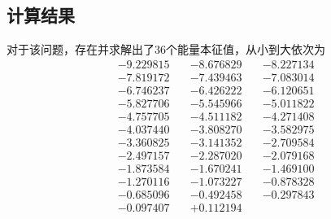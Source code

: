 \documentclass[twoside,twocolumn]{article}
\begin{document}
\begin{CJK*}{UTF8}{gkai}

\section{计算结果}
对于该问题，存在并求解出了36个能量本征值，从小到大依次为
\begin{equation*}
\begin{aligned}
&-9.229815 \quad&-8.676829 \quad&-8.227134 \\
&-7.819172 \quad&-7.439463 \quad&-7.083014 \\
&-6.746237 \quad&-6.426222 \quad&-6.120651 \\
&-5.827706 \quad&-5.545966 \quad&-5.011822 \\
&-4.757705 \quad&-4.511182 \quad&-4.271408 \\
&-4.037440 \quad&-3.808270 \quad&-3.582975 \\
&-3.360825 \quad&-3.141352 \quad&-2.709584 \\
&-2.497157 \quad&-2.287020 \quad&-2.079168 \\
&-1.873584 \quad&-1.670241 \quad&-1.469100 \\
&-1.270116 \quad&-1.073227 \quad&-0.878328 \\
&-0.685096 \quad&-0.492458 \quad&-0.297843 \\
&-0.097407 \quad&+0.112194 \quad
\end{aligned}
\end{equation*}



\end{CJK*}
\end{document}
